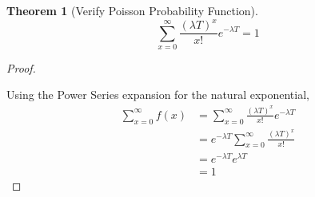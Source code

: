 \documentclass[10pt,]{book}
\theoremstyle{plain}
\newtheorem{theorem}{Theorem}[section]
\theoremstyle{definition}
\theoremstyle{definition}
\theoremstyle{definition}
\numberwithin{equation}{section}
\begin{document}
\begin{theorem}[{Verify Poisson Probability Function}]\label{theorem-46}
\begin{equation*}\sum_{x=0}^{\infty} \frac{(\lambda T)^x}{x!} e^{-\lambda T} = 1\end{equation*}\end{theorem}
\begin{proof}\hypertarget{proof-45}{}
Using the Power Series expansion for the natural exponential,
\begin{align*}
 \sum_{x=0}^{\infty} f(x) & = \sum_{x=0}^{\infty} \frac{(\lambda T)^x}{x!} e^{-\lambda T} \\
 & = e^{-\lambda T} \sum_{x=0}^{\infty} \frac{(\lambda T)^x}{x!} \\
 & = e^{-\lambda T} e^{\lambda T}  \\
 & = 1
\end{align*}
%
\end{proof}
\end{document}
